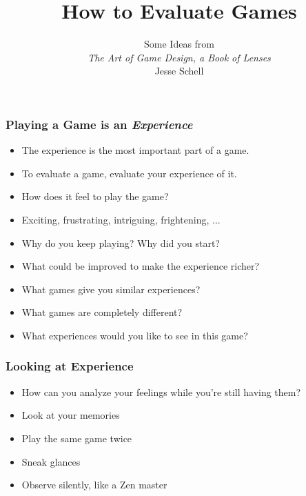 \documentclass{beamer}
\title{How to Evaluate Games}
\subtitle{Some Ideas from\\ {\em The Art of Game Design, a
  Book of Lenses}\\ Jesse Schell}
\begin{document}
\begin{frame}[plain]
  \titlepage
\end{frame}

\begin{frame}
  \frametitle{Playing a Game is an {\em Experience}}

\begin{itemize}
\item The experience is the most important part of a game.
\item To evaluate a game, evaluate your experience of it.\pause
  \item How does it feel to play the game?
  \item Exciting, frustrating, intriguing, frightening, ...
  \item Why do you keep playing?  Why did you start?
\item What could be improved to make the experience richer?
\item What games give you similar experiences?
\item What games are completely different?
\item What experiences would you like to see in this game?
\end{itemize}

\end{frame}

\begin{frame}
  \frametitle{Looking at Experience}

\begin{itemize}

\item How can you analyze your feelings while you're still having
  them?\pause
\item Look at your memories\pause
\item Play the same game twice\pause
\item Sneak glances\pause
\item Observe silently, like a Zen master

\end{itemize}

\end{frame}
\end{document}
